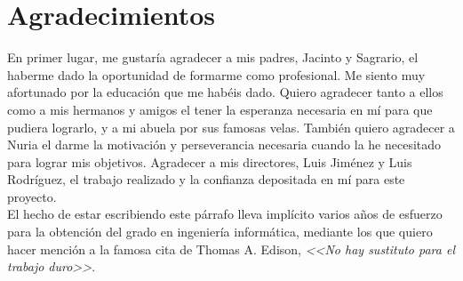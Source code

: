 \chapter*{Agradecimientos}
En primer lugar, me gustaría agradecer a mis padres, Jacinto y Sagrario, el haberme dado la oportunidad de formarme como profesional. Me siento muy afortunado por la educación que me habéis dado. Quiero agradecer tanto a ellos como a mis hermanos y amigos el tener la esperanza necesaria en mí para que pudiera lograrlo, y a mi abuela por sus famosas velas.
También quiero agradecer a Nuria el darme la motivación y perseverancia necesaria cuando la he necesitado para lograr mis objetivos.
Agradecer a mis directores, Luis Jiménez y Luis Rodríguez, el trabajo realizado y la confianza depositada en mí para este proyecto.\\

El hecho de estar escribiendo este párrafo lleva implícito varios años de esfuerzo para la obtención del grado en ingeniería informática, mediante los que quiero hacer mención a la famosa cita de Thomas A. Edison, \emph{<<No hay sustituto para el trabajo duro>>}.
\makeatletter
\begin{flushright}
	\textit{\@autor}
\end{flushright}
\makeatother
